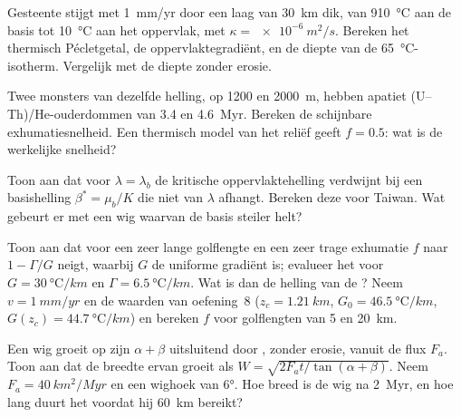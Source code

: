 \begin{exercise}[$\star\star$]\label{exo:b3:orogenic-wedges:8}
Gesteente stijgt met \qty{1}{mm/yr} door een laag van \qty{30}{km} dik, van
\qty{910}{\celsius} aan de basis tot \qty{10}{\celsius} aan het oppervlak, met
$\kappa = \qty{e-6}{m^2/s}$. Bereken het thermisch Pécletgetal, de oppervlaktegradiënt,
en de diepte van de \qty{65}{\celsius}-isotherm. Vergelijk met de diepte
zonder erosie.
\end{exercise}

\begin{exercise}[$\star\star$]\label{exo:b3:orogenic-wedges:9}
Twee monsters van dezelfde helling, op 1200 en \qty{2000}{m}, hebben apatiet
(U--Th)/He-ouderdommen van 3.4 en \qty{4.6}{Myr}. Bereken de schijnbare
exhumatiesnelheid. Een thermisch model van het reliëf geeft $f = 0.5$: wat is de werkelijke snelheid?
\end{exercise}

\begin{exercise}[$\star\star\star$]\label{exo:b3:orogenic-wedges:10}
Toon aan dat voor $\lambda = \lambda_b$ de kritische oppervlaktehelling verdwijnt bij een
basishelling $\beta^* = \mu_b/K$ die niet van $\lambda$ afhangt. Bereken deze voor
Taiwan. Wat gebeurt er met een wig waarvan de basis steiler helt?
\end{exercise}

\begin{exercise}[$\star\star\star$]\label{exo:b3:orogenic-wedges:11}
Toon aan dat voor een zeer lange golflengte en een zeer trage exhumatie $f$ naar
$1 - \Gamma/G$ neigt, waarbij $G$ de uniforme gradiënt is; evalueer het voor $G =
\qty{30}{\celsius/km}$ en $\Gamma = \qty{6.5}{\celsius/km}$. Wat is dan de
helling van de ? Neem $v = \qty{1}{mm/yr}$ en de
waarden van oefening~8 ($z_c = \qty{1.21}{km}$, $G_0 = \qty{46.5}{\celsius/km}$,
$G(z_c) = \qty{44.7}{\celsius/km}$) en bereken $f$ voor golflengten van 5 en
\qty{20}{km}.
\end{exercise}

\begin{exercise}[$\star\star\star$]\label{exo:b3:orogenic-wedges:12}
Een wig groeit op zijn  $\alpha + \beta$ uitsluitend door ,
zonder erosie, vanuit de flux $F_a$. Toon aan dat de breedte ervan groeit als
$W = \sqrt{2F_at/\tan(\alpha + \beta)}$. Neem $F_a = \qty{40}{km^2/Myr}$ en
een wighoek van \ang{6}. Hoe breed is de wig na \qty{2}{Myr}, en hoe lang duurt het
voordat hij \qty{60}{km} bereikt?
\end{exercise}

